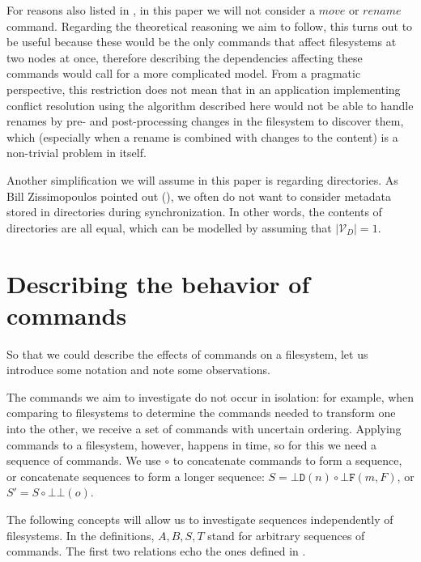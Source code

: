 \documentclass[12pt]{article}
\newcommand{\setvx}[1]{\mathcal{V}_{#1}}
\newcommand{\setd}{\setvx{D}} %
\newcommand{\empt}{\bot}
\newcommand{\fscommand}[2]{{#1#2}}
\newcommand{\fsregcommandchar}[1]{\mathtt{#1}}
\newcommand{\fsregcommand}[2]{\fscommand{\fsregcommandchar{#1}}{\fsregcommandchar{#2}}}
\newcommand{\cbb}{\fsregcommand{\empt}{\empt}}
\newcommand{\cbf}{\fsregcommand{\empt}{F}}
\newcommand{\cbd}{\fsregcommand{\empt}{D}}
\newcommand{\cc}{\circ} %
\theoremstyle{definition}
\begin{document}

For reasons also listed in \cite{NREC:alg}, in this paper we will not consider
a $move$ or $rename$ command. Regarding the theoretical reasoning we aim to follow,
this turns out to be useful because these would be the only commands that affect
filesystems at two nodes at once, therefore describing 
the dependencies affecting these commands
would call for a more complicated model.
From a pragmatic perspective, this restriction does not mean that in an application
implementing conflict resolution using the algorithm described here would not be
able to handle renames by pre- and post-processing changes in the filesystem to
discover them, which (especially when a rename is combined with changes to the content)
is a non-trivial problem in itself.

Another simplification we will assume in this paper is regarding directories.
As Bill Zissimopoulos pointed out (\cite{BZ}), we often do not want to consider metadata stored in
directories during synchronization. In other words, the contents of directories are all equal,
which can be modelled by assuming that $|\setd|=1$.




\section{Describing the behavior of commands}

So that we could describe the effects of commands on a filesystem, let us introduce some notation
and note some observations.

The commands we aim to investigate do not occur in isolation:
for example, when comparing to filesystems to determine the commands needed to transform one into the other,
we receive a set of commands with uncertain ordering.
Applying commands to a filesystem, however, happens in time,
so for this we need a sequence of commands.
We use $\cc$ to concatenate commands to form a sequence, or concatenate sequences to form a longer sequence:
$S=\cbd(n)\cc \cbf(m,F)$, or $S'=S\cc\cbb(o)$.

The following concepts will allow us to investigate sequences independently of filesystems.
In the definitions, $A,B,S,T$ stand for arbitrary sequences of commands.
The first two relations echo the ones defined in \cite{NREC:alg}.
\end{document}
